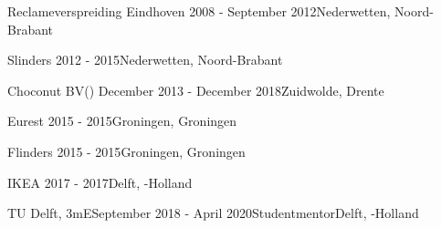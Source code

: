 \begin{rSection}{}
  \begin{experienceItem}
    {Reclameverspreiding Eindhoven}{ 2008 - September 2012}{}{Nederwetten, Noord-Brabant}
  \end{experienceItem}

  \begin{experienceItem}
    {Slinders}{ 2012 -  2015}{{}}{Nederwetten, Noord-Brabant}
  \end{experienceItem}

  \begin{experienceItem}
    {Choconut BV}{() December 2013 - December 2018}{}{Zuidwolde, Drente}
  \end{experienceItem}

  \begin{experienceItem}
    {Eurest}{ 2015 -  2015}{}{Groningen, Groningen}
  \end{experienceItem}

  \newpage
  \begin{experienceItem}
    {Flinders}{ 2015 -  2015}{}{Groningen, Groningen}
  \end{experienceItem}

  \begin{experienceItem}
    {IKEA}{ 2017 -  2017}{}{Delft, -Holland}
  \end{experienceItem}

  \begin{experienceItem}
    {TU Delft, 3mE}{September 2018 - April 2020}{Studentmentor}{Delft, -Holland}
  \end{experienceItem}


\end{rSection}
